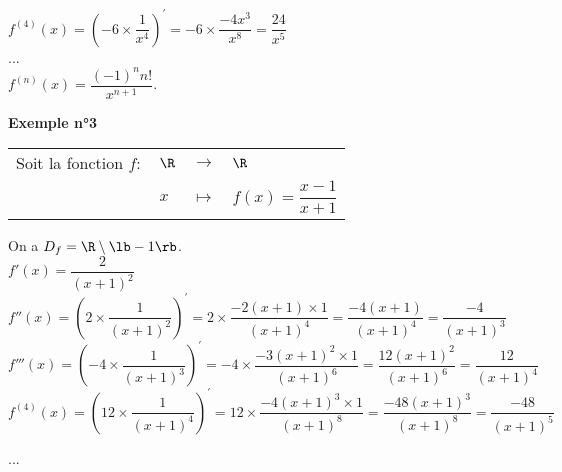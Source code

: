 $f^{(4)} \left(x\right) = \left( -6 \times \dfrac{1}{x^4}\right)^{'} = -6 \times \dfrac{-4x^3}{x^8} = \dfrac{24}{x^5}$ \vspace*{.3cm} \\ 

... \vspace*{.3cm} \\
 
$f^{(n)} \left(x\right) = \dfrac{\left(-1\right)^n n!}{x^{n+1}}$. \\

\newpage

\vspace*{-1.4cm}

\textbf{Exemple n°3} \\

\begin{tabular}{llll}
Soit la fonction $f :$ & $\R$ & $\longrightarrow$ & $\R$ \\
& $x$ & $\longmapsto$ & $f(x) = \dfrac{x-1}{x+1}$ \\
\end{tabular}

On a $D_f = \R \setminus \lb -1 \rb$. \\

$f' \left(x\right) = \dfrac{2}{\left(x+1\right)^2}$ \vspace*{.3cm} \\

$f''\left(x\right) = \left(2 \times \dfrac{1}{\left(x+1\right)^2}\right)^{'} = 2 \times \dfrac{-2\left(x+1\right) \times 1}{\left(x+1\right)^4} =  \dfrac{-4\left(x+1\right)}{\left(x+1\right)^4} = \dfrac{-4}{\left(x+1\right)^3}$ \vspace*{.3cm} \\

$f'''\left(x\right) = \left(-4 \times \dfrac{1}{\left(x+1\right)^3}\right)^{'} = -4 \times \dfrac{-3\left(x+1\right)^2 \times 1}{\left(x+1\right)^6} =  \dfrac{12\left(x+1\right)^2}{\left(x+1\right)^6} = \dfrac{12}{\left(x+1\right)^4}$ \vspace*{.3cm} \\

$f^{(4)}\left(x\right) = \left(12 \times \dfrac{1}{\left(x+1\right)^4}\right)^{'} = 12 \times \dfrac{-4\left(x+1\right)^3 \times 1}{\left(x+1\right)^{8}} =  \dfrac{-48\left(x+1\right)^3}{\left(x+1\right)^8} = \dfrac{-48}{\left(x+1\right)^5}$ \vspace*{.3cm} 

... \vspace*{.3cm} 

